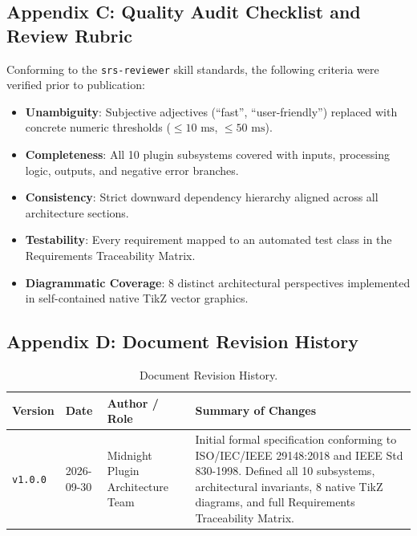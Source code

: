\subsection{Appendix C: Quality Audit Checklist and Review Rubric}
\label{sec:appendix_audit}

Conforming to the \texttt{srs-reviewer} skill standards, the following criteria were verified prior to publication:
\begin{itemize}
    \item[$\checkmark$] \textbf{Unambiguity}: Subjective adjectives (``fast'', ``user-friendly'') replaced with concrete numeric thresholds ($\le 10\text{ ms}$, $\le 50\text{ ms}$).
    \item[$\checkmark$] \textbf{Completeness}: All 10 plugin subsystems covered with inputs, processing logic, outputs, and negative error branches.
    \item[$\checkmark$] \textbf{Consistency}: Strict downward dependency hierarchy aligned across all architecture sections.
    \item[$\checkmark$] \textbf{Testability}: Every requirement mapped to an automated test class in the Requirements Traceability Matrix.
    \item[$\checkmark$] \textbf{Diagrammatic Coverage}: 8 distinct architectural perspectives implemented in self-contained native TikZ vector graphics.
\end{itemize}

\subsection{Appendix D: Document Revision History}
\label{sec:appendix_history}

\begin{table}[htbp]
    \centering
    \small
    \begin{tabularx}{\textwidth}{l l p{3.2cm} X}
        \toprule
        \textbf{Version} & \textbf{Date} & \textbf{Author / Role} & \textbf{Summary of Changes} \\
        \midrule
        \texttt{v1.0.0} & 2026-09-30 & Midnight Plugin Architecture Team & Initial formal specification conforming to ISO/IEC/IEEE 29148:2018 and IEEE Std 830-1998. Defined all 10 subsystems, architectural invariants, 8 native TikZ diagrams, and full Requirements Traceability Matrix. \\
        \bottomrule
    \end{tabularx}
    \caption{Document Revision History.}
    \label{tab:revision_history}
\end{table}
